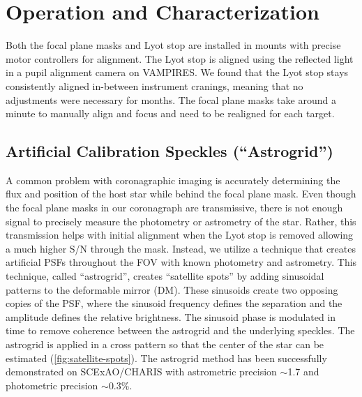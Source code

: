 \documentclass[]{spie}  %
\begin{document}
\section{Operation and Characterization}\label{sec:tests}

Both the focal plane masks and Lyot stop are installed in mounts with precise motor controllers for alignment. The Lyot stop is aligned using the reflected light in a pupil alignment camera on VAMPIRES. We found that the Lyot stop stays consistently aligned in-between instrument cranings, meaning that no adjustments were necessary for months. The focal plane masks take around a minute to manually align and focus and need to be realigned for each target.

\subsection{Artificial Calibration Speckles (``Astrogrid'')}

A common problem with coronagraphic imaging is accurately determining the flux and position of the host star while behind the focal plane mask. Even though the focal plane masks in our coronagraph are transmissive, there is not enough signal to precisely measure the photometry or astrometry of the star. Rather, this transmission helps with initial alignment when the Lyot stop is removed allowing a much higher S/N through the mask. Instead, we utilize a technique that creates artificial PSFs throughout the FOV with known photometry and astrometry. This technique, called ``astrogrid''\cite{sahoo2020}, creates ``satellite spots'' by adding sinusoidal patterns to the deformable mirror (DM). These sinusoids create two opposing copies of the PSF, where the sinusoid frequency defines the separation and the amplitude defines the relative brightness. The sinusoid phase is modulated in time to remove coherence between the astrogrid and the underlying speckles. The astrogrid is applied in a cross pattern so that the center of the star can be estimated (\autoref{fig:satellite-spots}). The astrogrid method has been successfully demonstrated on SCExAO/CHARIS with astrometric precision $\sim$\qty{1.7}{\milliarcsecond} and photometric precision $\sim$0.3\%\cite{currie2020}.
\end{document}
